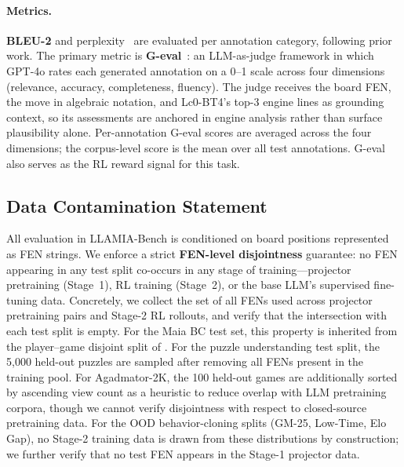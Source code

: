 \paragraph{Metrics.}
\textbf{BLEU-2} and perplexity~\citep{lee2022improving} are evaluated per annotation category, following prior work. The primary metric is \textbf{G-eval}~\citep{liu2023g}: an LLM-as-judge framework in which GPT-4o rates each generated annotation on a 0--1 scale across four dimensions (relevance, accuracy, completeness, fluency). The judge receives the board FEN, the move in algebraic notation, and Lc0-BT4's top-3 engine lines as grounding context, so its assessments are anchored in engine analysis rather than surface plausibility alone. Per-annotation G-eval scores are averaged across the four dimensions; the corpus-level score is the mean over all test annotations. G-eval also serves as the RL reward signal for this task.

\subsection{Data Contamination Statement}
\label{sec:app_bench_contamination}

All evaluation in LLAMIA-Bench is conditioned on board positions represented as FEN strings. We enforce a strict \textbf{FEN-level disjointness} guarantee: no FEN appearing in any test split co-occurs in any stage of training---projector pretraining (Stage~1), RL training (Stage~2), or the base LLM's supervised fine-tuning data. Concretely, we collect the set of all FENs used across projector pretraining pairs and Stage-2 RL rollouts, and verify that the intersection with each test split is empty. For the Maia BC test set, this property is inherited from the player--game disjoint split of \citet{mcilroy2020aligning}. For the puzzle understanding test split, the 5,000 held-out puzzles are sampled after removing all FENs present in the training pool. For Agadmator-2K, the 100 held-out games are additionally sorted by ascending view count as a heuristic to reduce overlap with LLM pretraining corpora, though we cannot verify disjointness with respect to closed-source pretraining data. For the OOD behavior-cloning splits (GM-25, Low-Time, Elo Gap), no Stage-2 training data is drawn from these distributions by construction; we further verify that no test FEN appears in the Stage-1 projector data.
